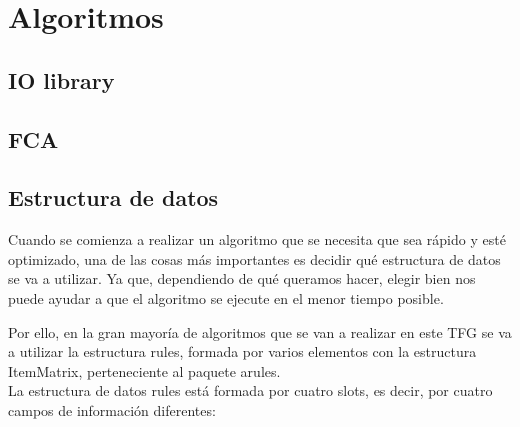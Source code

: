 \section{Algoritmos}
\subsection{IO library}



\subsection{FCA}




\clearpage
\subsection{Estructura de datos}

Cuando se comienza a realizar un algoritmo que se necesita que 
sea r\'apido y est\'e optimizado, una de las cosas m\'as importantes 
es decidir qu\'e estructura de datos se va a utilizar.
Ya que, dependiendo de qu\'e queramos hacer, elegir bien nos puede 
ayudar a que el algoritmo se ejecute en el menor tiempo posible.

Por ello, en la gran mayor\'ia de algoritmos que se van a realizar 
en este TFG se va a utilizar la estructura rules, formada por varios 
elementos con la estructura ItemMatrix, perteneciente al paquete 
arules.
\\

La estructura de datos rules est\'a formada por cuatro slots, es decir, por 
cuatro campos de informaci\'on diferentes:


